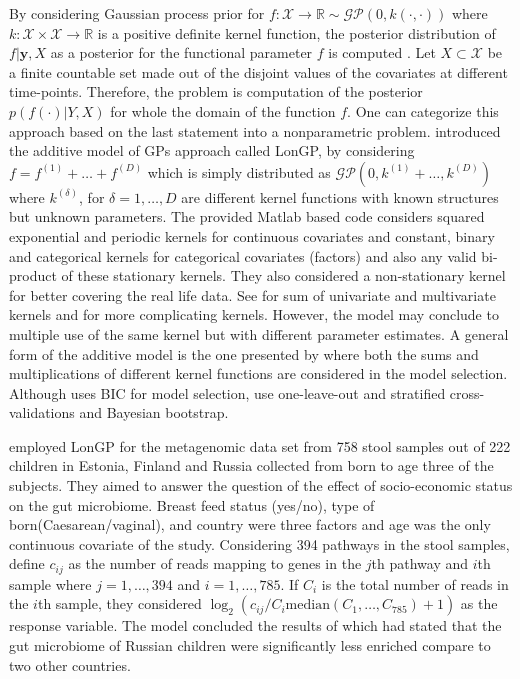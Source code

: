 \documentclass[]{article}
\begin{document}
		By considering Gaussian process prior for $f:\mathcal{X}\rightarrow\mathbb{R}\sim \mathcal{GP}(0,k(\cdot,\cdot))$ where $k:\mathcal{X}\times\mathcal{X}\rightarrow\mathbb{R}$ is a positive definite kernel function, the posterior distribution of $f|\mathbf{y},X$ as a posterior for the functional parameter $f$ is computed \citep{vanderWilketal2020}. Let $X\subset \mathcal{X}$ be a finite countable set made out of the disjoint values of the covariates at different time-points. Therefore, the problem is computation of the posterior $p(f(\cdot)|Y,X)$ for whole the domain of the function $f$. One can categorize this approach based on the last statement into a nonparametric problem. \cite{Chengetal2019} introduced the additive model of GPs approach called LonGP, by considering $f=f^{(1)}+\ldots+f^{(D)}$ which is simply distributed as $\mathcal{GP}(0,k^{(1)}+\ldots,k^{(D)})$ where $k^{(\delta)}$, for $\delta=1,\ldots,D$ are different kernel functions with known structures but unknown parameters. The provided Matlab based code considers squared exponential and periodic kernels for continuous covariates and constant, binary and categorical kernels for categorical covariates (factors) and also any valid bi-product of these stationary kernels. They also considered a non-stationary kernel for better covering the real life data. See \cite{Plate1999} for sum of univariate and multivariate kernels and \cite{Duvenaudetal2011} for more complicating kernels. However, the model may conclude to multiple use of the same kernel but with different parameter estimates. A general form of the additive model is the one presented by \cite{waveome} where both the sums and multiplications of different kernel functions are considered in the model selection. Although \cite{waveome} uses BIC for model selection, \cite{Chengetal2019} use one-leave-out and stratified cross-validations and Bayesian bootstrap. 
		
		\cite{Chengetal2019} employed LonGP for the metagenomic data set from 758 stool samples out of 222 children in Estonia, Finland and Russia collected from born to age three of the subjects. They aimed to answer the question of the effect of socio-economic status on the gut microbiome. Breast feed status (yes/no), type of born(Caesarean/vaginal), and country were three factors and age was the only continuous covariate of the study. Considering 394 pathways in the stool samples, define $c_{ij}$ as the number of reads mapping to genes in the $j$th pathway and $i$th sample where $j=1,\ldots,394$ and $i=1,\ldots,785$. If $C_i$ is the total number of reads in the $i$th sample, they considered $\log_2\left(c_{ij}/C_i \mathrm{median}(C_1,\ldots,C_{785})+1\right)$  as the response variable. The model concluded the results of \cite{Vatanen2016} which had stated that the gut microbiome of Russian children were significantly less enriched compare to two other countries. 
		
\end{document}

